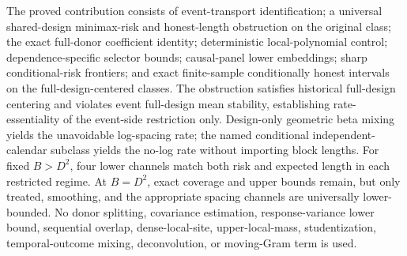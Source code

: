 \documentclass{article}
\begin{document}
The proved contribution consists of event-transport identification; a universal shared-design minimax-risk and honest-length obstruction on the original class; the exact full-donor coefficient identity; deterministic local-polynomial control; dependence-specific selector bounds; causal-panel lower embeddings; sharp conditional-risk frontiers; and exact finite-sample conditionally honest intervals on the full-design-centered classes.  The obstruction satisfies historical full-design centering and violates event full-design mean stability, establishing rate-essentiality of the event-side restriction only.  Design-only geometric beta mixing yields the unavoidable log-spacing rate; the named conditional independent-calendar subclass yields the no-log rate without importing block lengths.  For fixed \(B>D^2\), four lower channels match both risk and expected length in each restricted regime.  At \(B=D^2\), exact coverage and upper bounds remain, but only treated, smoothing, and the appropriate spacing channels are universally lower-bounded.  No donor splitting, covariance estimation, response-variance lower bound, sequential overlap, dense-local-site, upper-local-mass, studentization, temporal-outcome mixing, deconvolution, or moving-Gram term is used.
\end{document}
